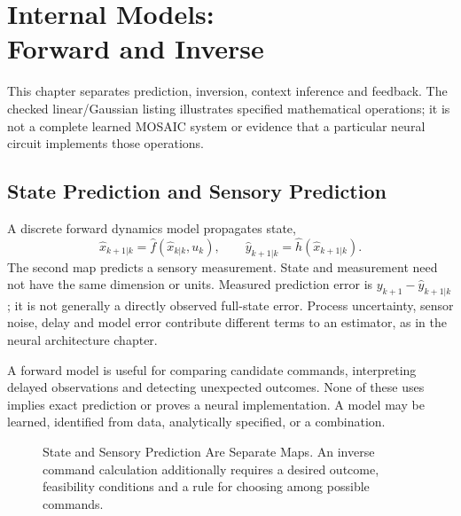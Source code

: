 \chapter[Internal Models: Forward and Inverse]{Internal Models:\\Forward and Inverse}
\label{ch:internal-models}

\begin{gomdraftnotice}
This chapter separates prediction, inversion, context inference and feedback.
The checked linear/Gaussian listing illustrates specified mathematical
operations; it is not a complete learned MOSAIC system or evidence that a
particular neural circuit implements those operations.
\end{gomdraftnotice}

\section{State Prediction and Sensory Prediction}

A discrete forward dynamics model propagates state,
\begin{equation}
 \hat x_{k+1|k}=\hat f(\hat x_{k|k},u_k),\qquad
 \hat y_{k+1|k}=\hat h(\hat x_{k+1|k}).
 \label{eq:ch6:forward-model}
\end{equation}
The second map predicts a sensory measurement. State and measurement need not
have the same dimension or units. Measured prediction error is
$y_{k+1}-\hat y_{k+1|k}$; it is not generally a directly observed full-state
error. Process uncertainty, sensor noise, delay and model error contribute
different terms to an estimator, as in the neural architecture chapter.

A forward model is useful for comparing candidate commands, interpreting
delayed observations and detecting unexpected outcomes. None of these uses
implies exact prediction or proves a neural implementation. A model may be
learned, identified from data, analytically specified, or a combination.

\begin{figure}[htbp]
\centering
{}
\caption{State and Sensory Prediction Are Separate Maps. An inverse command
calculation additionally requires a desired outcome, feasibility conditions
and a rule for choosing among possible commands.}
\label{fig:ch6:forward-inverse}
\end{figure}

